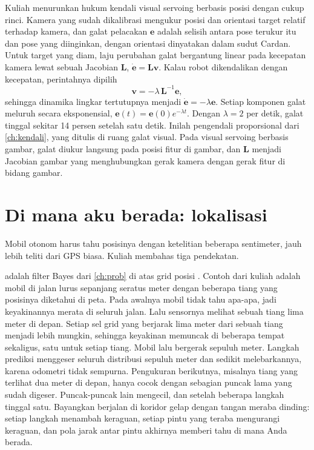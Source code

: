 Kuliah menurunkan hukum kendali visual servoing berbasis posisi dengan cukup rinci. Kamera yang sudah dikalibrasi mengukur posisi dan
orientasi target relatif terhadap kamera, dan galat pelacakan $\bm e$ adalah selisih antara pose terukur itu dan pose yang diinginkan,
dengan orientasi dinyatakan dalam sudut Cardan. Untuk target yang diam, laju perubahan galat bergantung linear pada kecepatan kamera
lewat sebuah Jacobian $\bm L$, $\dot{\bm e}=\bm L\bm v$. Kalau robot dikendalikan dengan kecepatan, perintahnya dipilih
\begin{equation}
\bm v=-\lambda\,\bm L^{-1}\bm e,
\end{equation}
sehingga dinamika lingkar tertutupnya menjadi $\dot{\bm e}=-\lambda\bm e$. Setiap komponen galat meluruh secara eksponensial,
$\bm e(t)=\bm e(0)e^{-\lambda t}$. Dengan $\lambda=2$ per detik, galat tinggal sekitar 14 persen setelah satu detik. Inilah
pengendali proporsional dari \cref{ch:kendali}, yang ditulis di ruang galat visual. Pada visual servoing berbasis gambar, galat diukur
langsung pada posisi fitur di gambar, dan $\bm L$ menjadi Jacobian gambar yang menghubungkan gerak kamera dengan gerak fitur di bidang
gambar.

\section{Di mana aku berada: lokalisasi}

Mobil otonom harus tahu posisinya dengan ketelitian beberapa sentimeter, jauh lebih teliti dari GPS biasa. Kuliah
membahas tiga pendekatan.

 adalah filter Bayes dari \cref{ch:prob} di atas grid posisi \citep{thrun2005}. Contoh dari
kuliah adalah mobil di jalan lurus sepanjang seratus meter dengan beberapa tiang yang posisinya diketahui di peta. Pada
awalnya mobil tidak tahu apa-apa, jadi keyakinannya merata di seluruh jalan. Lalu sensornya melihat sebuah tiang lima
meter di depan. Setiap sel grid yang berjarak lima meter dari sebuah tiang menjadi lebih mungkin, sehingga keyakinan
memuncak di beberapa tempat sekaligus, satu untuk setiap tiang. Mobil lalu bergerak sepuluh meter. Langkah prediksi
menggeser seluruh distribusi sepuluh meter dan sedikit melebarkannya, karena odometri tidak sempurna. Pengukuran
berikutnya, misalnya tiang yang terlihat dua meter di depan, hanya cocok dengan sebagian puncak lama yang sudah
digeser. Puncak-puncak lain mengecil, dan setelah beberapa langkah tinggal satu. Bayangkan berjalan di koridor gelap
dengan tangan meraba dinding: setiap langkah menambah keraguan, setiap pintu yang teraba mengurangi keraguan, dan pola
jarak antar pintu akhirnya memberi tahu di mana Anda berada.


